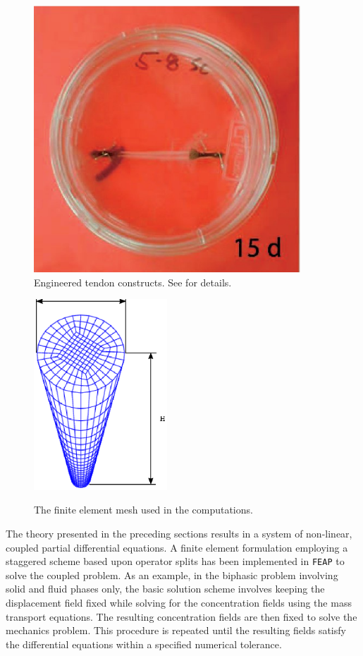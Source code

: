 \begin{figure}
\centering
  \includegraphics[width=10.00cm]{images/one-construct.eps}
\caption{Engineered tendon constructs. See \citet{Calve:04} for
  details.} 
\label{engconst}
\end{figure}

\begin{figure}[ht]
  \centering
  {\includegraphics[width=5cm]{images/mesh.eps}}
  \caption{The finite element mesh used in the computations.}
  \label{egmesh}
\end{figure}

The theory presented in the preceding sections results in a system of
non-linear, coupled partial differential equations. A finite element
formulation employing a staggered scheme based upon operator splits
\cite{Armero-poroplasticity:99,Garikipatiox2:01} has been implemented
in {\tt FEAP} \citep{feapmanual} to solve the coupled problem. As an
example, in the biphasic problem involving solid and fluid
phases only, the basic solution scheme involves keeping the displacement
field fixed while solving for the concentration fields using the mass
transport equations. The resulting concentration fields are then fixed
to solve the mechanics problem. This procedure is repeated until the
resulting fields satisfy the differential equations within a specified
numerical tolerance.

